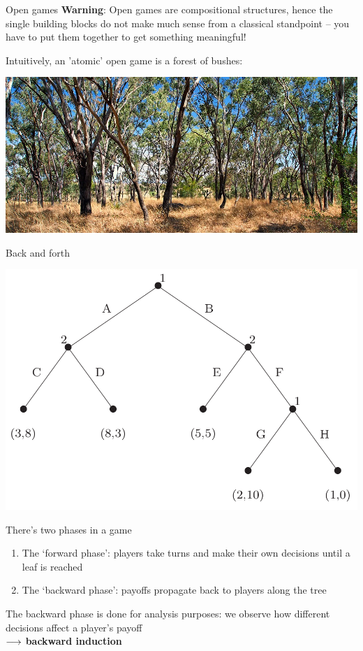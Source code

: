 \begin{frame}{Open games}
	\textbf{Warning}: Open games are compositional structures, hence the single building blocks do not make much sense from a classical standpoint -- you have to put them together to get something meaningful!

	\vfill
	Intuitively, an 'atomic' open game is a forest of bushes:

	\begin{center}
		\includegraphics[width=.9\textwidth]{figures/bush_forest.jpg}
	\end{center}
\end{frame}

\begin{frame}{Back and forth}
	\vspace{-5ex}
	\begin{center}
		\includegraphics[width=.5\textwidth]{figures/ext_game.png}
	\end{center}

	\vspace{-6ex}
	There's two phases in a game
	\begin{enumerate}
		\item The `forward phase': players take turns and make their own decisions until a leaf is reached
		\item The `backward phase': payoffs propagate back to players along the tree
	\end{enumerate}

	\vfill
	The backward phase is done for analysis purposes: we observe how different decisions affect a player's payoff\\
	\qquad $\longrightarrow$ \textbf{backward induction}
\end{frame}

